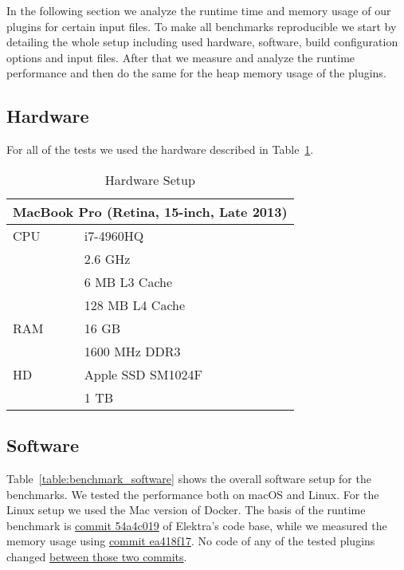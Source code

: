 In the following section we analyze the runtime time and memory usage of our plugins for certain input files. To make all benchmarks reproducible we start by detailing the whole setup including used hardware, software, build configuration options and input files. After that we measure and analyze the runtime performance and then do the same for the heap memory usage of the plugins.

\subsection{Hardware}

For all of the tests we used the hardware described in Table~\ref{table:benchmark_hardware}.

\begin{table}[H]
  \caption{Hardware Setup}
  \label{table:benchmark_hardware}
  \centering
  \begin{tabular}{ll}
\toprule
\multicolumn{2}{c}{MacBook Pro (Retina, 15-inch, Late 2013)}\\
\midrule
               CPU &            i7-4960HQ\\
                   &              2.6 GHz\\
                   &        6 MB L3 Cache\\
                   &      128 MB L4 Cache\\
               RAM &                16 GB\\
                   &        1600 MHz DDR3\\
                HD &    Apple SSD SM1024F\\
                   &                 1 TB\\
\bottomrule
  \end{tabular}
\end{table}

\subsection{Software}

Table~\ref{table:benchmark_software} shows the overall software setup for the benchmarks. We tested the performance both on macOS and Linux. For the Linux setup we used the Mac version of Docker. The basis of the runtime benchmark is \href{https://github.com/ElektraInitiative/libelektra/commit/54a4c0194946917b7d093e0777f465619b2f3d6f}{commit 54a4c019} of Elektra’s code base, while we measured the memory usage using \href{https://github.com/ElektraInitiative/libelektra/commit/ea418f177a5e2707f59f61b5e130a596abdd1c56}{commit ea418f17}. No code of any of the tested plugins changed \href{https://github.com/ElektraInitiative/libelektra/compare/54a4c0194946917b7d093e0777f465619b2f3d6f...ea418f177a5e2707f59f61b5e130a596abdd1c56}{between those two commits}.

